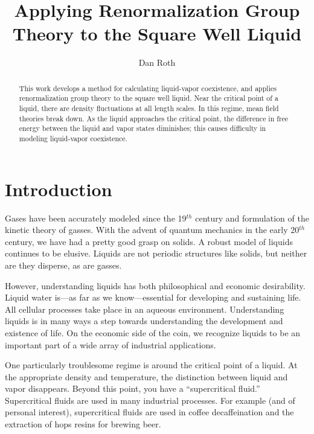 \documentclass[letterpaper,twocolumn,amsmath,amssymb,prb]{revtex4-1}
\begin{document}
\title{Applying Renormalization Group Theory to the Square Well Liquid}

\author{Dan Roth}

\begin{abstract}

This work develops a method for calculating liquid-vapor coexistence,
and applies renormalization group theory to the square well
liquid. Near the critical point of a liquid, there are density
fluctuations at all length scales. In this regime, mean field theories
break down. As the liquid approaches the critical point, the
difference in free energy between the liquid and vapor states
diminishes; this causes difficulty in modeling liquid-vapor
coexistence.

\end{abstract}

\maketitle

\section{Introduction}
Gases have been accurately modeled since the 19$^{th}$
century\cite{Lederman92} and formulation of the kinetic theory of gasses. With the
advent of quantum mechanics in the early 20$^{th}$ century, we have
had a pretty good grasp on solids. A robust model of liquids continues
to be elusive. Liquids are not periodic structures like solids, but
neither are they disperse, as are gasses.

However, understanding liquids has both philosophical and economic
desirability. Liquid water is---as far as we know---essential for
developing and sustaining life. All cellular processes take place in an
aqueous environment. Understanding liquids is in many ways a step
towards understanding the development and existence of life. On the
economic side of the coin, we recognize liquids to be an important
part of a wide array of industrial applications.

One particularly troublesome regime is around the critical
point of a liquid. At the appropriate density and temperature, the
distinction between liquid and vapor disappears. Beyond this point,
you have a ``supercritical fluid.'' Supercritical fluids are used in
many industrial processes.\cite{Perrut00} For example (and of personal
interest), supercritical fluids are used in coffee decaffeination and
the extraction of hops resins for brewing beer.
\end{document}
